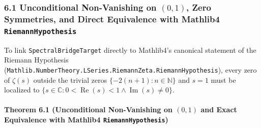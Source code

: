 \documentclass[
  11pt,
]{article}
\begin{document}
\subsubsection{\texorpdfstring{6.1 Unconditional Non-Vanishing on
\((0, 1)\), Zero Symmetries, and Direct Equivalence with Mathlib4
\texttt{RiemannHypothesis}}{6.1 Unconditional Non-Vanishing on (0, 1), Zero Symmetries, and Direct Equivalence with Mathlib4 RiemannHypothesis}}\label{unconditional-non-vanishing-on-0-1-zero-symmetries-and-direct-equivalence-with-mathlib4-riemannhypothesis}

To link \texttt{SpectralBridgeTarget} directly to Mathlib4's canonical
statement of the Riemann Hypothesis
(\texttt{Mathlib.NumberTheory.LSeries.RiemannZeta.RiemannHypothesis}),
every zero of \(\zeta(s)\) outside the trivial zeros
\(\{-2(n+1) : n \in \mathbb{N}\}\) and \(s = 1\) must be localized to
\(\{s \in \mathbb{C} : 0 < \operatorname{Re}(s) < 1 \land \operatorname{Im}(s) \neq 0\}\).

\paragraph{\texorpdfstring{Theorem 6.1 (Unconditional Non-Vanishing on
\((0, 1)\) and Exact Equivalence with Mathlib4
\texttt{RiemannHypothesis})}{Theorem 6.1 (Unconditional Non-Vanishing on (0, 1) and Exact Equivalence with Mathlib4 RiemannHypothesis)}}\label{theorem-6.1-unconditional-non-vanishing-on-0-1-and-exact-equivalence-with-mathlib4-riemannhypothesis}
\end{document}
